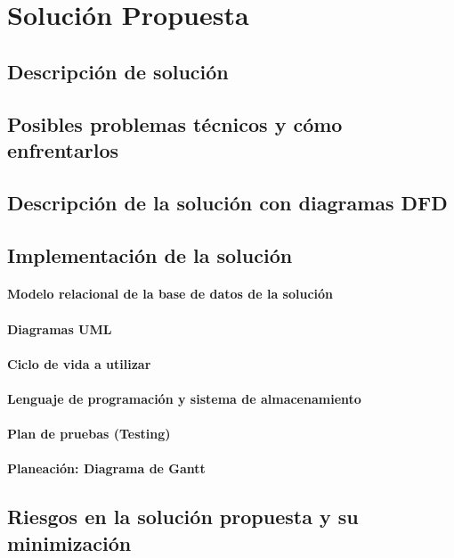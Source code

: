 \section{Soluci\'{o}n Propuesta}
\subsection{Descripci\'{o}n de soluci\'{o}n}
\subsection{Posibles problemas t\'{e}cnicos y c\'{o}mo enfrentarlos}
\subsection{Descripci\'{o}n de la soluci\'{o}n con diagramas DFD}

\subsection{Implementaci\'{o}n de la soluci\'{o}n}
\paragraph{Modelo relacional de la base de datos de la soluci\'{o}n}
\paragraph{Diagramas UML}
\paragraph{Ciclo de vida a utilizar}
\paragraph{Lenguaje de programaci\'{o}n y sistema de almacenamiento}
\paragraph{Plan de pruebas (Testing)}
\paragraph{Planeaci\'{o}n: Diagrama de Gantt}

\subsection{Riesgos en la soluci\'{o}n propuesta y su minimizaci\'{o}n}